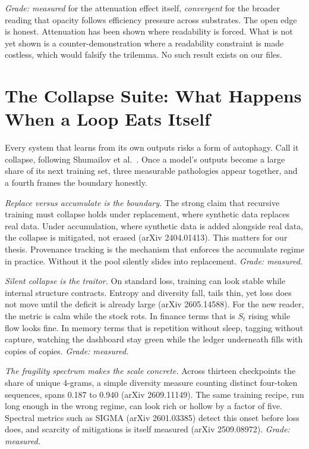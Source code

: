 \textit{Grade: measured} for the attenuation effect itself, \textit{convergent} for the broader reading that opacity follows efficiency pressure across substrates. The open edge is honest. Attenuation has been shown where readability is forced. What is not yet shown is a counter-demonstration where a readability constraint is made costless, which would falsify the trilemma. No such result exists on our files.

\section{The Collapse Suite: What Happens When a Loop Eats Itself}
\label{sec:ch09-collapse}

Every system that learns from its own outputs risks a form of autophagy. Call it collapse, following Shumailov et al.\ \cite{shumailov2024}. Once a model's outputs become a large share of its next training set, three measurable pathologies appear together, and a fourth frames the boundary honestly.

\textit{Replace versus accumulate is the boundary.} The strong claim that recursive training must collapse holds under replacement, where synthetic data replaces real data. Under accumulation, where synthetic data is added alongside real data, the collapse is mitigated, not erased (arXiv 2404.01413). This matters for our thesis. Provenance tracking is the mechanism that enforces the accumulate regime in practice. Without it the pool silently slides into replacement. \textit{Grade: measured.}

\textit{Silent collapse is the traitor.} On standard loss, training can look stable while internal structure contracts. Entropy and diversity fall, tails thin, yet loss does not move until the deficit is already large (arXiv 2605.14588). For the new reader, the metric is calm while the stock rots. In finance terms that is $S_t$ rising while flow looks fine. In memory terms that is repetition without sleep, tagging without capture, watching the dashboard stay green while the ledger underneath fills with copies of copies. \textit{Grade: measured.}

\textit{The fragility spectrum makes the scale concrete.} Across thirteen checkpoints the share of unique 4-grams, a simple diversity measure counting distinct four-token sequences, spans 0.187 to 0.940 (arXiv 2609.11149). The same training recipe, run long enough in the wrong regime, can look rich or hollow by a factor of five. Spectral metrics such as SIGMA (arXiv 2601.03385) detect this onset before loss does, and scarcity of mitigations is itself measured (arXiv 2509.08972). \textit{Grade: measured.}

